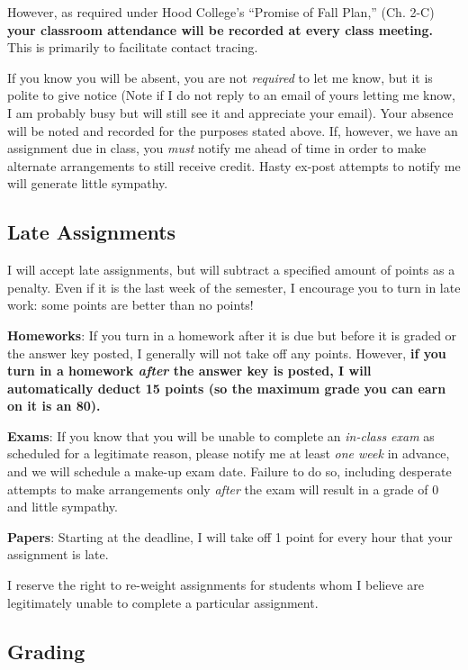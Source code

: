 \documentclass{article}
\begin{document}
However, as required under Hood College's ``Promise of Fall Plan,'' (Ch.
2-C) \textbf{your classroom attendance will be recorded at every class
meeting.} This is primarily to facilitate contact tracing.

If you know you will be absent, you are not \emph{required} to let me
know, but it is polite to give notice (Note if I do not reply to an
email of yours letting me know, I am probably busy but will still see it
and appreciate your email). Your absence will be noted and recorded for
the purposes stated above. If, however, we have an assignment due in
class, you \emph{must} notify me ahead of time in order to make
alternate arrangements to still receive credit. Hasty ex-post attempts
to notify me will generate little sympathy.

\hypertarget{late-assignments}{%
\subsection{Late Assignments}\label{late-assignments}}

I will accept late assignments, but will subtract a specified amount of
points as a penalty. Even if it is the last week of the semester, I
encourage you to turn in late work: some points are better than no
points!

\textbf{Homeworks}: If you turn in a homework after it is due but before
it is graded or the answer key posted, I generally will not take off any
points. However, \textbf{if you turn in a homework \emph{after} the
answer key is posted, I will automatically deduct 15 points (so the
maximum grade you can earn on it is an 80).}

\textbf{Exams}: If you know that you will be unable to complete an
\emph{in-class exam} as scheduled for a legitimate reason, please notify
me at least \emph{one week} in advance, and we will schedule a make-up
exam date. Failure to do so, including desperate attempts to make
arrangements only \emph{after} the exam will result in a grade of 0 and
little sympathy.

\textbf{Papers}: Starting at the deadline, I will take off 1 point for
every hour that your assignment is late.

I reserve the right to re-weight assignments for students whom I believe
are legitimately unable to complete a particular assignment.

\hypertarget{grading}{%
\subsection{Grading}\label{grading}}
\end{document}
